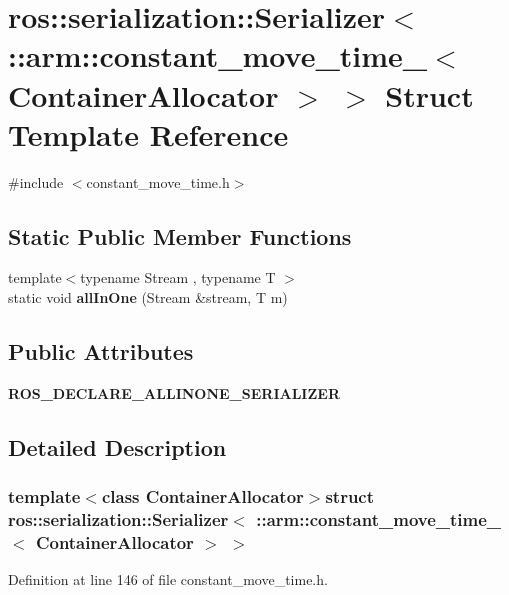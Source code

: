 \section{ros\-:\-:serialization\-:\-:\-Serializer$<$ \-:\-:arm\-:\-:constant\-\_\-move\-\_\-time\-\_\-$<$ \-Container\-Allocator $>$ $>$ \-Struct \-Template \-Reference}
\label{structros_1_1serialization_1_1Serializer_3_01_1_1arm_1_1constant__move__time___3_01ContainerAllocator_01_4_01_4}


{\ttfamily \#include $<$constant\-\_\-move\-\_\-time.\-h$>$}

\subsection*{\-Static \-Public \-Member \-Functions}
\begin{DoxyCompactItemize}
\item 
{\footnotesize template$<$typename Stream , typename T $>$ }\\static void {\bf all\-In\-One} (\-Stream \&stream, \-T m)
\end{DoxyCompactItemize}
\subsection*{\-Public \-Attributes}
\begin{DoxyCompactItemize}
\item 
{\bf \-R\-O\-S\-\_\-\-D\-E\-C\-L\-A\-R\-E\-\_\-\-A\-L\-L\-I\-N\-O\-N\-E\-\_\-\-S\-E\-R\-I\-A\-L\-I\-Z\-E\-R}
\end{DoxyCompactItemize}


\subsection{\-Detailed \-Description}
\subsubsection*{template$<$class Container\-Allocator$>$struct ros\-::serialization\-::\-Serializer$<$ \-::arm\-::constant\-\_\-move\-\_\-time\-\_\-$<$ Container\-Allocator $>$ $>$}



\-Definition at line 146 of file constant\-\_\-move\-\_\-time.\-h.



